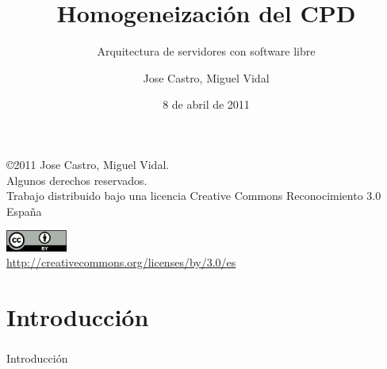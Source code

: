 \documentclass{beamer}
\begin{document}
\title{Homogeneización del CPD}
\subtitle{Arquitectura de servidores con software libre}
\author{Jose Castro, Miguel Vidal}
\date{8 de abril de 2011}


\begin{frame}
  \vspace{2cm}
  \begin{flushright}
    {\footnotesize \copyright{2011} Jose Castro, Miguel Vidal.} \\
    \vspace{0.25cm}
    {\scriptsize Algunos derechos reservados. \\
    Trabajo distribuido bajo una licencia Creative Commons Reconocimiento 3.0 España}\\
    \vspace{0.10cm}
  \end{flushright}
  \begin{center}
    \href{http://creativecommons.org/licenses/by/3.0/es}{\includegraphics[width=2cm]{figs/cc-by.png}} \\
    {\tiny \url{http://creativecommons.org/licenses/by/3.0/es}}
  \end{center}
\end{frame}


\section{Introducción}
\begin{frame}
  \frametitle{}
  \begin{center}
    \Huge Introducción
  \end{center}
\end{frame}
\end{document}
